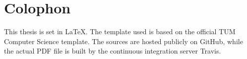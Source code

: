 

\chapter{Colophon}
\label{chapter:Colophon}
This thesis is set in \LaTeX \cite{latex}. The template used is based on the official TUM Computer Science template. The sources are hosted publicly on GitHub, while the actual PDF file is built by the continuous integration server Travis.
